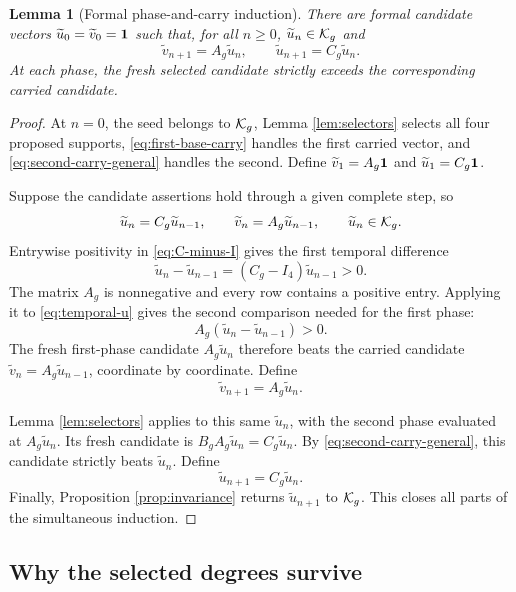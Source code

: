 \documentclass[11pt]{article}
\newtheorem{lemma}[theorem]{Lemma}
\theoremstyle{remark}
\numberwithin{equation}{section}
\begin{document}
\begin{lemma}[Formal phase-and-carry induction]\label{lem:phase-induction}
There are formal candidate vectors
\(\widetilde u_0=\widetilde v_0=\mathbf{1}\) such that, for all \(n\geq0\),
\(\widetilde u_n\in\mathcal{K}_g\) and
\[
\widetilde v_{n+1}=A_g\widetilde u_n,\qquad
\widetilde u_{n+1}=C_g\widetilde u_n.
\]
At each phase, the fresh selected candidate strictly exceeds the
corresponding carried candidate.
\end{lemma}

\begin{proof}
At \(n=0\), the seed belongs to \(\mathcal{K}_g\), Lemma
\ref{lem:selectors} selects all four proposed supports,
\eqref{eq:first-base-carry} handles the first carried vector, and
\eqref{eq:second-carry-general} handles the second.  Define
\(\widetilde v_1=A_g\mathbf{1}\) and
\(\widetilde u_1=C_g\mathbf{1}\).

Suppose the candidate assertions hold through a given complete step, so
\[
\widetilde u_n=C_g\widetilde u_{n-1},\qquad
\widetilde v_n=A_g\widetilde u_{n-1},\qquad
\widetilde u_n\in\mathcal{K}_g.
\]
Entrywise positivity in \eqref{eq:C-minus-I} gives the first temporal
difference
\begin{equation}\label{eq:temporal-u}
\widetilde u_n-\widetilde u_{n-1}
=(C_g-I_4)\widetilde u_{n-1}>0.
\end{equation}
The matrix \(A_g\) is nonnegative and every row contains a positive entry.
Applying it to \eqref{eq:temporal-u} gives the second comparison needed for
the first phase:
\begin{equation}\label{eq:temporal-v}
A_g(\widetilde u_n-\widetilde u_{n-1})>0.
\end{equation}
The fresh first-phase candidate \(A_g\widetilde u_n\) therefore beats the
carried candidate
\(\widetilde v_n=A_g\widetilde u_{n-1}\), coordinate by coordinate.  Define
\[
\widetilde v_{n+1}=A_g\widetilde u_n.
\]

Lemma \ref{lem:selectors} applies to this same \(\widetilde u_n\), with the
second phase evaluated at \(A_g\widetilde u_n\).  Its fresh candidate is
\(B_gA_g\widetilde u_n=C_g\widetilde u_n\).  By
\eqref{eq:second-carry-general}, this candidate strictly beats
\(\widetilde u_n\).  Define
\[
\widetilde u_{n+1}=C_g\widetilde u_n.
\]
Finally, Proposition \ref{prop:invariance} returns
\(\widetilde u_{n+1}\) to
\(\mathcal{K}_g\).  This closes all parts of the simultaneous induction.
\end{proof}

\subsection{Why the selected degrees survive}
\end{document}
